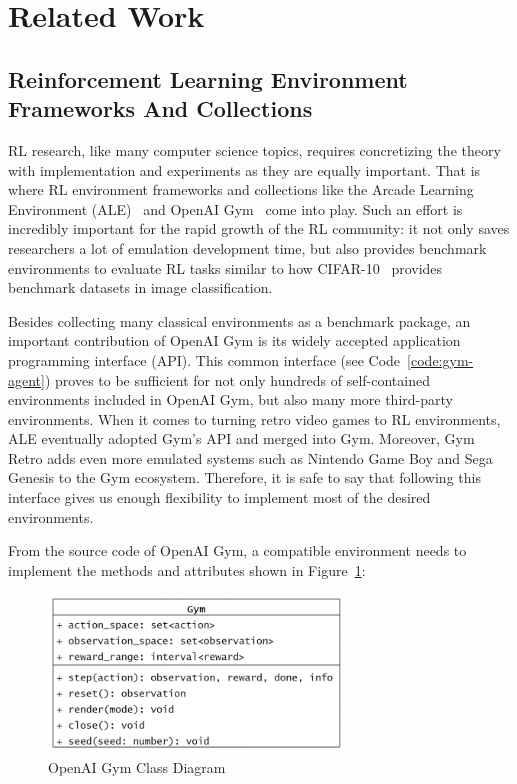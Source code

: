 \section{Related Work}

\subsection{Reinforcement Learning Environment Frameworks And Collections}
RL research, like many computer science topics, requires concretizing the theory with implementation and experiments as they are equally important. That is where RL environment frameworks and collections like the Arcade Learning Environment (ALE)~\parencite{ale} and OpenAI Gym~\parencite{openai-gym} come into play. Such an effort is incredibly important for the rapid growth of the RL community: it not only saves researchers a lot of emulation development time, but also provides benchmark environments to evaluate RL tasks similar to how CIFAR-10~\parencite{cifar-10} provides benchmark datasets in image classification.

Besides collecting many classical environments as a benchmark package, an important contribution of OpenAI Gym is its widely accepted application programming interface (API). This common interface (see Code~\ref{code:gym-agent}) proves to be sufficient for not only hundreds of self-contained environments included in OpenAI Gym, but also many more third-party environments. When it comes to turning retro video games to RL environments, ALE eventually adopted Gym's API and merged into Gym. Moreover, Gym Retro \parencite{gym-retro} adds even more emulated systems such as Nintendo Game Boy and Sega Genesis to the Gym ecosystem. Therefore, it is safe to say that following this interface gives us enough flexibility to implement most of the desired environments.

From the source code of OpenAI Gym, a compatible environment needs to implement the methods and attributes shown in Figure~\ref{fig:gym-class}:

\begin{figure}[H]
    \centering
    \includegraphics[width=0.7\textwidth]{images/gym-class.png}
    \caption{OpenAI Gym Class Diagram}
    \label{fig:gym-class}
\end{figure}

